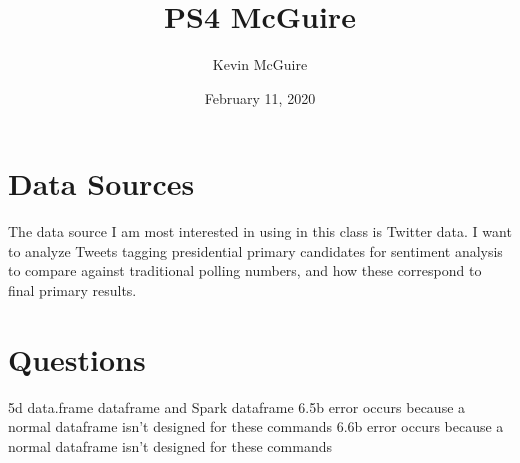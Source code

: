\documentclass{article}
\title{PS4 McGuire}
\author{Kevin McGuire }
\date{February 11, 2020}
\begin{document}
\maketitle

\section{Data Sources}
The data source I am most interested in using in this class is Twitter data. I want to analyze Tweets tagging presidential primary candidates for sentiment analysis to compare against traditional polling numbers, and how these correspond to final primary results.

\section{Questions}
5d data.frame  dataframe and Spark dataframe \newline
6.5b error occurs because a normal dataframe isn't designed for these commands \newline
6.6b error occurs because a normal dataframe isn't designed for these commands
\end{document}
